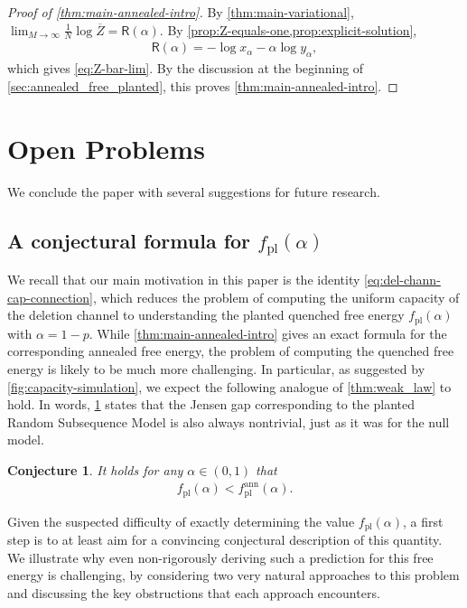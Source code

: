 \documentclass[11pt]{amsart}
\numberwithin{equation}{section}
\numberwithin{equation}{section}
\newcommand{\1}{\mathbbm{1}}
\newcommand{\fpl}{f_{\mathrm{pl}}}
\newcommand{\fplann}{f_{\mathrm{pl}}^{\mathrm{ann}}}
\newtheorem{conjecture}[theorem]{Conjecture}
\theoremstyle{definition}
\begin{document}
\begin{proof}[Proof of \cref{thm:main-annealed-intro}]
    By \cref{thm:main-variational},
    $\lim_{M\to\infty}\frac{1}{N}\log\overline{Z}=\mathsf R(\alpha)$.
    By \cref{prop:Z-equals-one,prop:explicit-solution},
    \begin{align*}
        \mathsf R(\alpha)=-\log x_\alpha-\alpha\log y_\alpha,
    \end{align*}
    which gives \eqref{eq:Z-bar-lim}. By the discussion at the beginning of \cref{sec:annealed_free_planted}, this proves \cref{thm:main-annealed-intro}.
\end{proof}


\section{Open Problems} \label{sec:open_problems}

We conclude the paper with several suggestions for future research.

\subsection{\texorpdfstring{A conjectural formula for $\fpl(\alpha)$}{A conjectural formula for the planted free energy}}

We recall that our main motivation in this paper is the identity \eqref{eq:del-chann-cap-connection}, which reduces the problem of computing the uniform capacity of the deletion channel to understanding the planted quenched free energy $f_{\mathrm{pl}}(\alpha)$ with $\alpha = 1-p$. While \cref{thm:main-annealed-intro} gives an exact formula for the corresponding annealed free energy, the problem of computing the quenched free energy is likely to be much more challenging. In particular, as suggested by \cref{fig:capacity-simulation}, we expect the following analogue of \cref{thm:weak_law} to hold. In words, \cref{conj:planted-jensen-gap} states that the Jensen gap corresponding to the planted Random Subsequence Model is also always nontrivial, just as it was for the null model.
\begin{conjecture} \label{conj:planted-jensen-gap}
    It holds for any $\alpha \in (0, 1)$ that
    \begin{align*}
        \fpl(\alpha) < \fplann(\alpha).
    \end{align*}
\end{conjecture}
Given the suspected difficulty of exactly determining the value $\fpl(\alpha)$, a first step is to at least aim for a convincing conjectural description of this quantity. We illustrate why even non-rigorously deriving such a prediction for this free energy is challenging, by considering two very natural approaches to this problem and discussing the key obstructions that each approach encounters.
\end{document}
